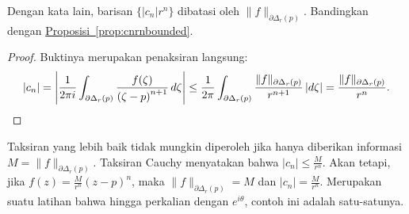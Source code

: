 \documentclass[12pt,openany]{book}
\newcommand{\sabs}[1]{\lvert {#1} \rvert}
\newcommand{\snorm}[1]{\lVert {#1} \rVert}
\newcommand{\abs}[1]{\left\lvert {#1} \right\rvert}
\theoremstyle{plain}
\theoremstyle{remark}
\theoremstyle{definition}
\theoremstyle{exercise}
\theoremstyle{example}
\newcommand{\propref}[1]{\hyperref[#1]{Proposisi~\ref*{#1}}}
\begin{document}
Dengan kata lain, barisan $\bigl\{ \sabs{c_n} r^n \bigr\}$ dibatasi oleh
$\snorm{f}_{\partial \Delta_r(p)}$.  Bandingkan dengan \propref{prop:cnrnbounded}.

\begin{proof}
Buktinya merupakan penaksiran langsung:
\begin{equation*}
\sabs{c_n}  = 
\abs{
\frac{1}{2\pi i}
\int_{\partial \Delta_r(p)}
\frac{f(\zeta)}{{(\zeta-p)}^{n+1}}
\,
d \zeta 
}
\leq
\frac{1}{2\pi}
\int_{\partial \Delta_r(p)}
\frac{\snorm{f}_{\partial \Delta_r(p)}}{r^{n+1}}
\,
\sabs{d \zeta} 
=
\frac{\snorm{f}_{\partial \Delta_r(p)}}{r^{n}} .
\qedhere
\end{equation*}
\end{proof}

Taksiran yang lebih baik tidak mungkin diperoleh jika hanya diberikan informasi
$M = \snorm{f}_{\partial \Delta_r(p)}$.
Taksiran Cauchy menyatakan bahwa
$\sabs{c_n} \leq \frac{M}{r^n}$.
Akan tetapi, jika $f(z) = \frac{M}{r^n} {(z-p)}^n$, maka
$\snorm{f}_{\partial \Delta_r(p)} = M$ dan
$\sabs{c_n} = \frac{M}{r^n}$.  Merupakan suatu latihan bahwa hingga
perkalian dengan $e^{i\theta}$, contoh ini adalah satu-satunya.
\end{document}
